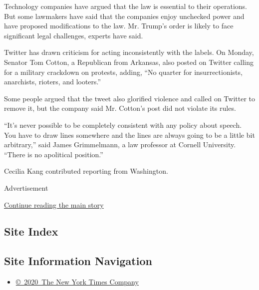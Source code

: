 Technology companies have argued that the law is essential to their
operations. But some lawmakers have said that the companies enjoy
unchecked power and have proposed modifications to the law. Mr. Trump's
order is likely to face significant legal challenges, experts have said.

Twitter has drawn criticism for acting inconsistently with the labels.
On Monday, Senator Tom Cotton, a Republican from Arkansas, also posted
on Twitter calling for a military crackdown on protests, adding, ``No
quarter for insurrectionists, anarchists, rioters, and looters.''

Some people argued that the tweet also glorified violence and called on
Twitter to remove it, but the company said Mr. Cotton's post did not
violate its rules.

``It's never possible to be completely consistent with any policy about
speech. You have to draw lines somewhere and the lines are always going
to be a little bit arbitrary,'' said James Grimmelmann, a law professor
at Cornell University. ``There is no apolitical position.''

Cecilia Kang contributed reporting from Washington.

Advertisement

\protect\hyperlink{after-bottom}{Continue reading the main story}

\hypertarget{site-index}{%
\subsection{Site Index}\label{site-index}}

\hypertarget{site-information-navigation}{%
\subsection{Site Information
Navigation}\label{site-information-navigation}}

\begin{itemize}
\tightlist
\item
  \href{https://help.nytimes3xbfgragh.onion/hc/en-us/articles/115014792127-Copyright-notice}{©~2020~The
  New York Times Company}
\end{itemize}

